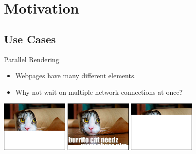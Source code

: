 \documentclass[xcolor=dvipsnames]{beamer}
\begin{document}
\section{Motivation}


\subsection{Use Cases}
\begin{frame}{Parallel Rendering}
	\begin{itemize}
		\item Webpages have many different elements.
		\item Why not wait on multiple network connections at once?
	\end{itemize}
	\linegap
	\begin{center}
	\includegraphics[width=0.25\textwidth]{burrito-2.jpg}
	\hspace{0.05\textwidth}
	\includegraphics[width=0.25\textwidth]{burrito-3.jpg}
	\hspace{0.05\textwidth}
	\includegraphics[width=0.25\textwidth]{burrito-1.jpg}
	\end{center}
\end{frame}
\end{document}

